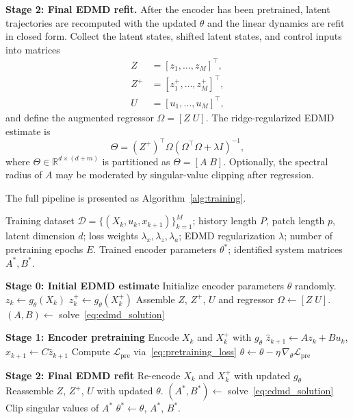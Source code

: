 \documentclass[journal]{IEEEtran}
\begin{document}
\textbf{Stage 2: Final EDMD refit.}
After the encoder has been pretrained, latent trajectories are recomputed with the updated $\theta$ and the linear dynamics are refit in closed form. Collect the latent states, shifted latent states, and control inputs into matrices
\begin{align}
    Z &= [z_1,\ldots,z_M]^\top, \\
    Z^{+} &= [z_1^{+},\ldots,z_M^{+}]^\top, \\
    U &= [u_1,\ldots,u_M]^\top,
\end{align}
and define the augmented regressor $\Omega=[Z\;U]$. The ridge-regularized EDMD estimate is
\begin{equation}
    \Theta = (Z^{+})^\top \Omega
    \left(\Omega^\top\Omega + \lambda I\right)^{-1},
    \label{eq:edmd_solution}
\end{equation}
where $\Theta \in \mathbb{R}^{d\times(d+m)}$ is partitioned as $\Theta = [A\;B]$. Optionally, the spectral radius of $A$ may be moderated by singular-value clipping after regression.

The full pipeline is presented as Algorithm~\ref{alg:training}.

\begin{algorithm}[!t]
\caption{Transformer-Koopman Training Pipeline}
\label{alg:training}
\begin{algorithmic}[1]
\REQUIRE Training dataset $\mathcal{D}=\{(X_k,u_k,x_{k+1})\}_{k=1}^{M}$;
         history length $P$, patch length $p$, latent dimension $d$;
         loss weights $\lambda_x,\lambda_z,\lambda_a$;
         EDMD regularization $\lambda$;
         number of pretraining epochs $E$.
\ENSURE  Trained encoder parameters $\theta^{*}$;
         identified system matrices $A^{*},B^{*}$.

\STATE \textbf{Stage 0: Initial EDMD estimate}
\STATE Initialize encoder parameters $\theta$ randomly.
    \STATE $z_k \leftarrow g_\theta(X_k)$
    \STATE $z_k^{+} \leftarrow g_\theta(X_k^{+})$
\ENDFOR
\STATE Assemble $Z$, $Z^{+}$, $U$ and regressor $\Omega \leftarrow [Z\;U]$.
\STATE $(A,B) \leftarrow$ solve~\eqref{eq:edmd_solution}

\STATE \textbf{Stage 1: Encoder pretraining}
        \STATE Encode $X_k$ and $X_k^{+}$ with $g_\theta$
        \STATE $\hat{z}_{k+1} \leftarrow Az_k+Bu_k$, $\hat{x}_{k+1} \leftarrow C\hat{z}_{k+1}$
        \STATE Compute $\mathcal{L}_{\mathrm{pre}}$ via~\eqref{eq:pretraining_loss}
        \STATE $\theta \leftarrow \theta - \eta\,\nabla_\theta\mathcal{L}_{\mathrm{pre}}$
    \ENDFOR
\ENDFOR

\STATE \textbf{Stage 2: Final EDMD refit}
    \STATE Re-encode $X_k$ and $X_k^{+}$ with updated $g_\theta$
\ENDFOR
\STATE Reassemble $Z$, $Z^{+}$, $U$ with updated $\theta$.
\STATE $(A^{*},B^{*}) \leftarrow$ solve~\eqref{eq:edmd_solution}
    \STATE Clip singular values of $A^{*}$
\ENDIF
\RETURN $\theta^{*} \leftarrow \theta$,\; $A^{*}$,\; $B^{*}$.
\end{algorithmic}
\end{algorithm}
\end{document}
